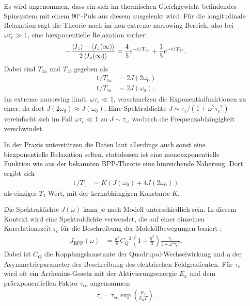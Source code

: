 Es wird angenommen, dass ein sich im thermischen Gleichgewicht befindendes Spinsystem mit einem 90$^\circ$-Puls aus diesem ausgelenkt wird. Für die longitudinale Relaxation sagt die Theorie nach \cite{hubbard} im non-extreme narrowing Bereich, also bei $\omega \tau_c \gg 1$, eine biexponentielle Relaxation vorher:
\begin{align}
    - \frac{\Braket{I_z} - \Braket{I_z(\infty)}}{2\Braket{I_z(\infty)}} = \frac{4}{5}e^{-t/T_{1a}} + \frac{1}{5}e^{-t/T_{1b}}.
\end{align}
Dabei sind $T_{1a}$ und $T_{1b}$ gegeben als
\begin{align}
    1/T_{1a} &= 2J(2\omega_0) \\
    1/T_{1b} &= 2J(\omega_0).
\end{align}
Im extreme narrowing limit, $\omega \tau_c \ll 1$, verschmelzen die Exponentialfunktionen zu einer, da dort $J(2\omega_0) \approx J(\omega_0)$. Eine Spektraldichte $J \sim \tau_c / (1 + \omega^2 {\tau_c}^2)$ vereinfacht sich im Fall $\omega \tau_c \ll 1$ zu $J \sim \tau_c$, wodurch die Frequenzabhängigkeit verschwindet.

In der Praxis unterstützen die Daten laut \cite{eckert} allerdings auch sonst eine biexponentielle Relaxation selten, stattdessen ist eine monoexponentielle Funktion wie aus der bekannten BPP-Theorie \cite{bpp} eine hinreichende Näherung. Dort ergibt sich
\begin{align}
    1/T_1 &= K (J(\omega_0) + 4J(2\omega_0)) \label{eqn:bpp}
\end{align}
als einziger $T_1$-Wert, mit der kernabhängigen Konstante $K$.

Die Spektraldichte $J(\omega)$ kann je nach Modell unterschiedlich sein. In diesem Kontext wird eine Spektraldichte verwendet, die auf einer einzelnen Korrelationszeit $\tau_c$ für die Beschreibung der Molekülbewegungen basiert \cite{eckert}:
\begin{align}
    J_\text{BPP}(\omega) &= \frac{\pi^2}{5} {C_Q}^2 \left( 1 + \frac{\eta^2}{3} \right) \frac{\tau_c}{1 + \omega^2 {\tau_c}^2}. \label{eqn:spektraldichte_j}
\end{align}
Dabei ist $C_Q$ die Kopplungskonstante der Quadrupol-Wechselwirkung und $\eta$ der Asymmetrieparameter der Beschreibung des elektrischen Feldgradienten. Für $\tau_c$ wird oft ein Arrhenius-Gesetz mit der Aktivierungsenergie $E_a$ und dem präexponentiellen Faktor $\tau_{co}$ angenommen:
\begin{align}
    \tau_c = \tau_{co} \exp \left( \frac{E_a}{k_B T} \right). \label{eqn:theo:tauc}
\end{align}


